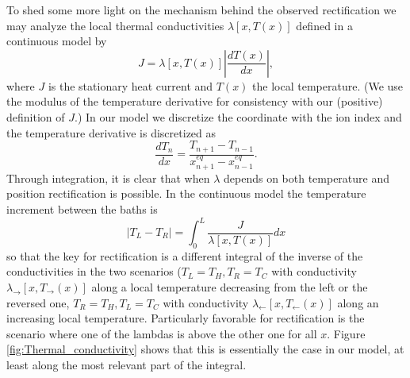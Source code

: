 To shed some more light on the mechanism behind the observed rectification we may analyze the local thermal conductivities
$\lambda[x,T(x)]$
{defined in a continuous model by} \cite{Peyrard2006}
%
\begin{equation}
    J = \lambda [x,T(x)]\left|\frac{dT (x)}{dx}\right|,
    \label{eq:thermalConductivityDefinition}
\end{equation}
%
where $J$ is the stationary heat current and $T(x)$ the local temperature.
(We use the modulus of the temperature derivative for consistency with our (positive) definition of $J$.)
In our model we discretize the coordinate with the ion index
and the temperature derivative is discretized as
%
\begin{equation}
    \frac{dT_n}{dx} = \frac{T_{n+1}-T_{n-1}}{x^{eq}_{n+1}-x^{eq}_{n-1}}.
    \label{eq:finiteDifferences}
\end{equation}
%
%
Through integration, it is clear that when $\lambda$ depends on both temperature and position rectification is possible.
In the continuous model the temperature increment between the  baths is
%
\begin{equation}
|T_L-T_R|=\int_0^L  \frac{J}{\lambda[x,T(x)]} dx
\end{equation}
%
so that the key for rectification is a different integral of the inverse of the  conductivities in the two scenarios ($T_L=T_H, T_R=T_C$  with conductivity $\lambda_\rightarrow[x,T_\rightarrow(x)]$ along a local temperature decreasing from the left
or the reversed one, $T_R=T_H, T_L=T_C$ with conductivity $\lambda_\leftarrow[x,T_\leftarrow(x)]$ along an increasing local temperature.
Particularly favorable for rectification is the scenario where one of the lambdas is above the other one for all $x$.
Figure \ref{fig:Thermal_conductivity} shows that this is essentially the case in our model, at least along the most relevant part of the integral.
